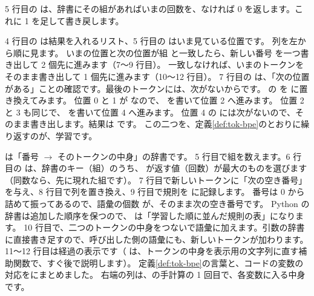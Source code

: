 5 行目の  は、辞書にその組があればいまの回数を、なければ 0 を返します。これに 1 を足して書き戻します。


4 行目の  は結果を入れるリスト、5 行目の  はいま見ている位置です。
列を左から順に見ます。
いまの位置と次の位置が組  と一致したら、新しい番号  を一つ書き出して 2 個先に進みます（7〜9 行目）。
一致しなければ、いまのトークンをそのまま書き出して 1 個先に進みます（10〜12 行目）。
7 行目の  は、「次の位置がある」ことの確認です。最後のトークンには、次がないからです。
\code{[1, 2, 1, 2, 3]} の  を  に置き換えてみます。
位置 0 と 1 が  なので、 を書いて位置 2 へ進みます。
位置 2 と 3 も同じで、 を書いて位置 4 へ進みます。
位置 4 の  には次がないので、そのまま書き出します。結果は \code{[9, 9, 3]} です。
この二つを、定義\ref{def:tok-bpe}のとおりに繰り返すのが、学習です。


 は「番号 $\to$ そのトークンの中身」の辞書です。
5 行目で組を数えます。6 行目の  は、辞書のキー（組）のうち、 が返す値（回数）が最大のものを選びます（同数なら、先に現れた組です）。
7 行目で新しいトークンに「次の空き番号」を与え、8 行目で列を置き換え、9 行目で規則を  に記録します。
番号は 0 から詰めて振ってあるので、語彙の個数  が、そのまま次の空き番号です。
Python の辞書は追加した順序を保つので、 は「学習した順に並んだ規則の表」になります。
10 行目で、二つのトークンの中身をつないで語彙に加えます。引数の辞書  に直接書き足すので、呼び出した側の語彙にも、新しいトークンが加わります。
11〜12 行目は経過の表示です（ は、トークンの中身を表示用の文字列に直す補助関数で、すぐ後で説明します）。
定義\ref{def:tok-bpe}の言葉と、コードの変数の対応をにまとめました。
右端の列は、の手計算の 1 回目で、各変数に入る中身です。

